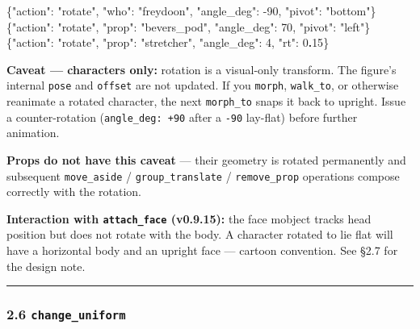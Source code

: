 \documentclass[
  11pt,
]{book}
\newenvironment{Shaded}{}{}
\newcommand{\DataTypeTok}[1]{\textcolor[rgb]{0.56,0.13,0.00}{#1}}
\newcommand{\DecValTok}[1]{\textcolor[rgb]{0.25,0.63,0.44}{#1}}
\newcommand{\ErrorTok}[1]{\textcolor[rgb]{1.00,0.00,0.00}{\textbf{#1}}}
\newcommand{\FunctionTok}[1]{\textcolor[rgb]{0.02,0.16,0.49}{#1}}
\newcommand{\StringTok}[1]{\textcolor[rgb]{0.25,0.44,0.63}{#1}}
\begin{document}
\begin{Shaded}
\begin{Highlighting}[]
\FunctionTok{\{}\DataTypeTok{"action"}\FunctionTok{:} \StringTok{"rotate"}\FunctionTok{,} \DataTypeTok{"who"}\FunctionTok{:} \StringTok{"freydoon"}\FunctionTok{,} \DataTypeTok{"angle\_deg"}\FunctionTok{:} \DecValTok{{-}90}\FunctionTok{,} \DataTypeTok{"pivot"}\FunctionTok{:} \StringTok{"bottom"}\FunctionTok{\}}
\FunctionTok{\{}\DataTypeTok{"action"}\FunctionTok{:} \StringTok{"rotate"}\FunctionTok{,} \DataTypeTok{"prop"}\FunctionTok{:} \StringTok{"bevers\_pod"}\FunctionTok{,} \DataTypeTok{"angle\_deg"}\FunctionTok{:} \DecValTok{70}\FunctionTok{,} \DataTypeTok{"pivot"}\FunctionTok{:} \StringTok{"left"}\FunctionTok{\}}
\FunctionTok{\{}\DataTypeTok{"action"}\FunctionTok{:} \StringTok{"rotate"}\FunctionTok{,} \DataTypeTok{"prop"}\FunctionTok{:} \StringTok{"stretcher"}\FunctionTok{,}  \DataTypeTok{"angle\_deg"}\FunctionTok{:} \DecValTok{4}\FunctionTok{,}  \DataTypeTok{"rt"}\FunctionTok{:} \DecValTok{0}\ErrorTok{.}\DecValTok{15}\FunctionTok{\}}
\end{Highlighting}
\end{Shaded}

\textbf{Caveat --- characters only:} rotation is a visual-only
transform. The figure's internal \texttt{pose} and \texttt{offset} are
not updated. If you \texttt{morph}, \texttt{walk\_to}, or otherwise
reanimate a rotated character, the next \texttt{morph\_to} snaps it back
to upright. Issue a counter-rotation (\texttt{angle\_deg:\ +90} after a
\texttt{-90} lay-flat) before further animation.

\textbf{Props do not have this caveat} --- their geometry is rotated
permanently and subsequent \texttt{move\_aside} /
\texttt{group\_translate} / \texttt{remove\_prop} operations compose
correctly with the rotation.

\textbf{Interaction with \texttt{attach\_face} (v0.9.15):} the face
mobject tracks head position but does not rotate with the body. A
character rotated to lie flat will have a horizontal body and an upright
face --- cartoon convention. See §2.7 for the design note.

\begin{center}\rule{0.5\linewidth}{0.5pt}\end{center}

\subsubsection{\texorpdfstring{2.6
\texttt{change\_uniform}}{2.6 change\_uniform}}\label{change_uniform}
\end{document}
